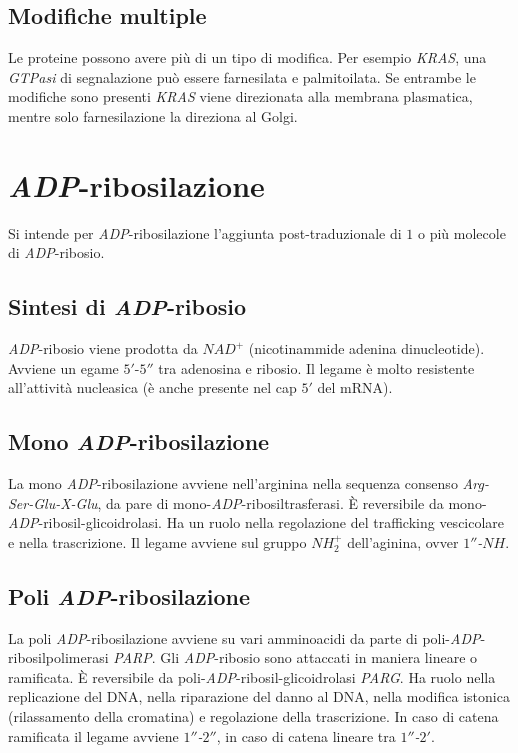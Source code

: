 	\subsection{Modifiche multiple}
	Le proteine possono avere pi\`u di un tipo di modifica. 
	Per esempio \emph{KRAS}, una \emph{GTPasi} di segnalazione pu\`o essere farnesilata e palmitoilata. 
	Se entrambe le modifiche sono presenti \emph{KRAS} viene direzionata alla membrana plasmatica, mentre solo farnesilazione la direziona al Golgi.

\section{\emph{ADP}-ribosilazione}
Si intende per \emph{ADP}-ribosilazione l'aggiunta post-traduzionale di $1$ o pi\`u molecole di \emph{ADP}-ribosio.

	\subsection{Sintesi di \emph{ADP}-ribosio}
	\emph{ADP}-ribosio viene prodotta da \emph{$NAD^+$} (nicotinammide adenina dinucleotide).
	Avviene un egame $5'$-$5''$ tra adenosina e ribosio. 
	Il legame \`e molto resistente all'attivit\`a nucleasica (\`e anche presente nel cap $5'$ del mRNA).

	\subsection{Mono \emph{ADP}-ribosilazione}
	La mono \emph{ADP}-ribosilazione avviene nell'arginina nella sequenza consenso \emph{Arg-Ser-Glu-X-Glu}, da pare di mono-\emph{ADP}-ribosiltrasferasi. 
	\`E reversibile da mono-\emph{ADP}-ribosil-glicoidrolasi. 
	Ha un ruolo nella regolazione del trafficking vescicolare e nella trascrizione.
	Il legame avviene sul gruppo \emph{$NH_2^+$} dell'aginina, ovver \emph{$1''$-$NH$}.

	\subsection{Poli \emph{ADP}-ribosilazione}
	La poli \emph{ADP}-ribosilazione avviene su vari amminoacidi da parte di poli-\emph{ADP}-ribosilpolimerasi \emph{PARP}. 
	Gli \emph{ADP}-ribosio sono attaccati in maniera lineare o ramificata.
	\`E reversibile da poli-\emph{ADP}-ribosil-glicoidrolasi \emph{PARG}.
	Ha ruolo nella replicazione del DNA, nella riparazione del danno al DNA, nella modifica istonica (rilassamento della cromatina) e regolazione della trascrizione.
	In caso di catena ramificata il legame avviene \emph{$1''$-$2''$}, in caso di catena lineare tra \emph{$1''$-$2'$}.

